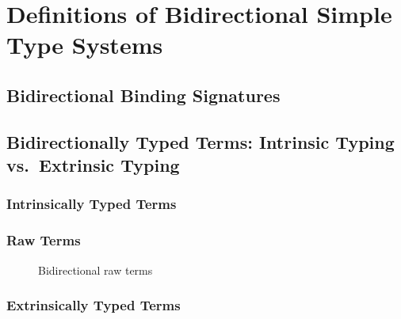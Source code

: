 \documentclass[acmsmall]{acmart}
\begin{document}
\section{Definitions of Bidirectional Simple Type Systems} 

\subsection{Bidirectional Binding Signatures}

\begin{definition}
  
\end{definition}


\begin{example}
  
\end{example}

\subsection{Bidirectionally Typed Terms: Intrinsic Typing vs.\ Extrinsic Typing}

\subsubsection{Intrinsically Typed Terms}

\subsubsection{Raw Terms}

\begin{figure}
  \caption{Bidirectional raw terms}
\end{figure}

\subsubsection{Extrinsically Typed Terms}
\end{document}
